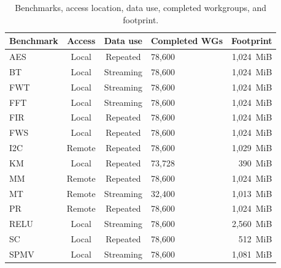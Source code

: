 \begin{table}[t]
  \centering
  \caption{Benchmarks, access location, data use, completed workgroups, and footprint.}
  \label{table:Benchmark}
  \scriptsize
  \setlength{\tabcolsep}{3pt}
  \begin{tabularx}{\columnwidth}{lccXr}
    \toprule
    \textbf{Benchmark} & \textbf{Access} & \textbf{Data use} &
    \textbf{Completed WGs} & \textbf{Footprint} \\
    \midrule
    AES  & Local  & Repeated  & 78,600 & 1,024~MiB \\
    BT   & Local  & Streaming & 78,600 & 1,024~MiB \\
    FWT  & Local  & Streaming & 78,600 & 1,024~MiB \\
    FFT  & Local  & Streaming & 78,600 & 1,024~MiB \\
    FIR  & Local  & Repeated  & 78,600 & 1,024~MiB \\
    FWS  & Local  & Repeated  & 78,600 & 1,024~MiB \\
    I2C  & Remote & Repeated  & 78,600 & 1,029~MiB \\
    KM   & Local  & Repeated  & 73,728 & 390~MiB \\
    MM   & Remote & Repeated  & 78,600 & 1,024~MiB \\
    MT   & Remote & Streaming & 32,400 & 1,013~MiB \\
    PR   & Remote & Repeated  & 78,600 & 1,024~MiB \\
    RELU & Local  & Streaming & 78,600 & 2,560~MiB \\
    SC   & Local  & Repeated  & 78,600 & 512~MiB \\
    SPMV & Local  & Streaming & 78,600 & 1,081~MiB \\
    \bottomrule
  \end{tabularx}
\end{table}
